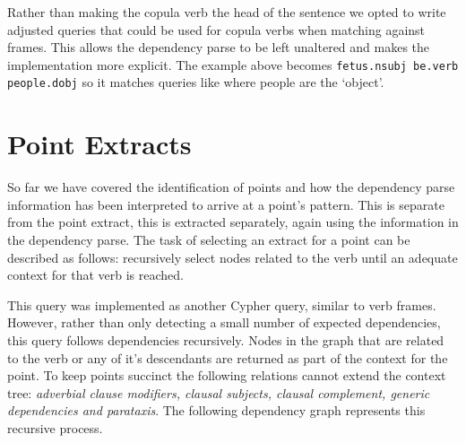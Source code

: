       Rather than making the copula verb the head of the sentence we opted to write adjusted queries that could be used for copula verbs when matching against frames. This allows the dependency parse to be left unaltered and makes the implementation more explicit. The example above becomes \texttt{fetus.nsubj be.verb people.dobj} so it matches queries like where people are the `object'.

  \section{Point Extracts}
    So far we have covered the identification of points and how the dependency parse information has been interpreted to arrive at a point's pattern. This is separate from the point extract, this is extracted separately, again using the information in the dependency parse. The task of selecting an extract for a point can be described as follows: recursively select nodes related to the verb until an adequate context for that verb is reached.

    This query was implemented as another Cypher query, similar to verb frames. However, rather than only detecting a small number of expected dependencies, this query follows dependencies recursively. Nodes in the graph that are related to the verb or any of it's descendants are returned as part of the context for the point. To keep points succinct the following relations cannot extend the context tree: \textit{adverbial clause modifiers, clausal subjects, clausal complement, generic dependencies and parataxis}. The following dependency graph represents this recursive process.

